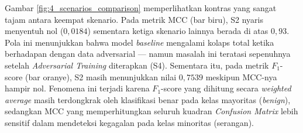 \documentclass[11pt, a4paper]{article}
\begin{document}
Gambar \ref{fig:4_scenarios_comparison} memperlihatkan kontras yang sangat tajam antara keempat skenario. Pada metrik MCC (bar biru), S2 nyaris menyentuh nol ($0{,}0184$) sementara ketiga skenario lainnya berada di atas $0{,}93$. Pola ini menunjukkan bahwa model \textit{baseline} mengalami kolaps total ketika berhadapan dengan data adversarial — namun masalah ini teratasi sepenuhnya setelah \textit{Adversarial Training} diterapkan (S4). Sementara itu, pada metrik $F_1$-score (bar oranye), S2 masih menunjukkan nilai $0{,}7539$ meskipun MCC-nya hampir nol. Fenomena ini terjadi karena $F_1$-score yang dihitung secara \textit{weighted average} masih terdongkrak oleh klasifikasi benar pada kelas mayoritas (\textit{benign}), sedangkan MCC yang memperhitungkan seluruh kuadran \textit{Confusion Matrix} lebih sensitif dalam mendeteksi kegagalan pada kelas minoritas (serangan).
\end{document}
